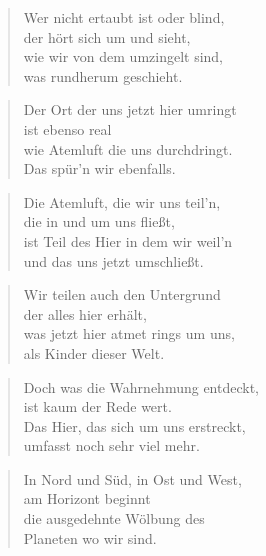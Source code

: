 \documentclass[10pt,a4paper]{article}
\begin{document}
\begin{paracol}{2}
\begin{verse}
Wer nicht ertaubt ist oder blind, \\
der hört sich um und sieht, \\
wie wir von dem umzingelt sind, \\
was rundherum geschieht. \\
\end{verse}

\begin{verse}
Der Ort der uns jetzt hier umringt \\
ist ebenso real \\
wie Atemluft die uns durchdringt. \\
Das spür’n wir ebenfalls. \\
\end{verse}

\begin{verse}
Die Atemluft, die wir uns teil’n, \\
die in und um uns fließt, \\
ist Teil des Hier in dem wir weil’n \\
und das uns jetzt umschließt. \\
\end{verse}

\begin{verse}
Wir teilen auch den Untergrund \\
der alles hier erhält, \\
was jetzt hier atmet rings um uns, \\
als Kinder dieser Welt. \\
\end{verse}

\begin{verse}
Doch was die Wahrnehmung entdeckt, \\
ist kaum der Rede wert. \\
Das Hier, das sich um uns erstreckt, \\
umfasst noch sehr viel mehr. \\
\end{verse}

\begin{verse}
In Nord und Süd, in Ost und West, \\
am Horizont beginnt \\
die ausgedehnte Wölbung des \\
Planeten wo wir sind. \\
\end{verse}


\end{paracol}
\end{document}
